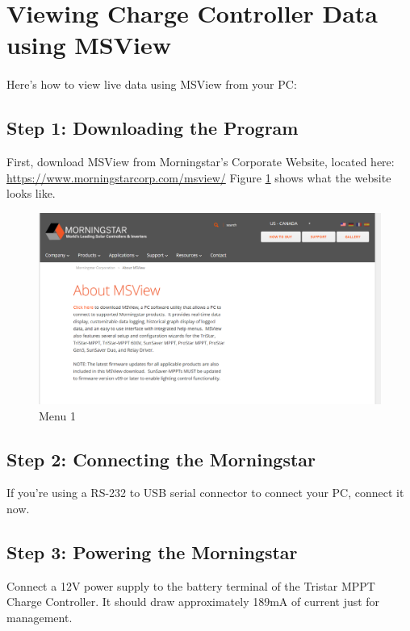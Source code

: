 \section{Viewing Charge Controller Data using MSView}

\paragraph{}
Here’s how to view live data using MSView from your PC:

\subsection{Step 1: Downloading the Program}
First, download MSView from Morningstar’s Corporate Website, located here:
\href{https://www.morningstarcorp.com/msview/}{https://www.morningstarcorp.com/msview/}
Figure \ref{fig:ms-website} shows what the website looks like.


\begin{figure}[h]
\includegraphics[width=\textwidth]{./graphics/tsmppt_troubleshooting/ms_1.png}
\caption{\label{fig:ms-website} Menu 1}
\end{figure}

\subsection{Step 2: Connecting the Morningstar}
If you’re using a RS-232 to USB serial connector to connect your PC, connect it now.

\subsection{Step 3: Powering the Morningstar}
Connect a 12V power supply to the battery terminal of the Tristar MPPT Charge Controller. It should draw approximately 189mA of current just for management.

